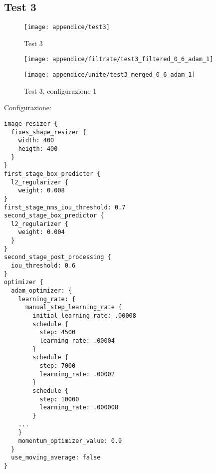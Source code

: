 \newpage
\subsection{Test 3}
\begin{figure}[!ht] 
    \centering
    \texttt{[image: appendice/test3]} 
    \caption{Test 3}
    \label{img:test-1}
\end{figure} 
\newpage



\begin{figure}[H]  
    \begin{minipage}{.5\columnwidth}  
        \centering  
        \texttt{[image: appendice/filtrate/test3\_filtered\_0\_6\_adam\_1]}  
    \end{minipage}%
    \begin{minipage}{0.5\columnwidth}  
        \centering  
        \texttt{[image: appendice/unite/test3\_merged\_0\_6\_adam\_1]}  
    \end{minipage}  
    \caption{Test 3, configurazione 1}
\end{figure}%
Configurazione:
\begin{multicols}{2}
    \begin{lstlisting}
image_resizer {
  fixes_shape_resizer {
    width: 400
    heigth: 400
  }
}
first_stage_box_predictor {
  l2_regularizer {
    weight: 0.008
}
first_stage_nms_iou_threshold: 0.7
second_stage_box_predictor {
  l2_regularizer {
    weight: 0.004
  }
}
second_stage_post_processing {
  iou_threshold: 0.6
}
optimizer {
  adam_optimizer: {
    learning_rate: {
      manual_step_learning_rate {
        initial_learning_rate: .00008
        schedule {
          step: 4500
          learning_rate: .00004
        }
        schedule {
          step: 7000
          learning_rate: .00002
        }
        schedule {
          step: 10000
          learning_rate: .000008
        }
    ...
    }
    momentum_optimizer_value: 0.9
  }
  use_moving_average: false
}
\end{lstlisting}
\end{multicols}

